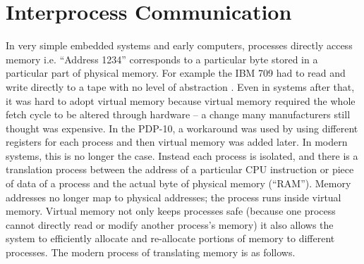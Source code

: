 \chapter{Interprocess Communication}


In very simple embedded systems and early computers, processes directly access memory i.e. ``Address 1234'' corresponds to a particular byte stored in a particular part of physical memory. For example the IBM 709 had to read and write directly to a tape with no level of abstraction \cite[P. 65]{ibm709}. Even in systems after that, it was hard to adopt virtual memory because virtual memory required the whole fetch cycle to be altered through hardware -- a change many manufacturers still thought was expensive. In the PDP-10, a workaround was used by using different registers for each process and then virtual memory was added later. In modern systems, this is no longer the case. Instead each process is isolated, and there is a translation process between the address of a particular CPU instruction or piece of data of a process and the actual byte of physical memory (``RAM''). Memory addresses no longer map to physical addresses; the process runs inside virtual memory. Virtual memory not only keeps processes safe (because one process cannot directly read or modify another process's memory) it also allows the system to efficiently allocate and re-allocate portions of memory to different processes. The modern process of translating memory is as follows.

